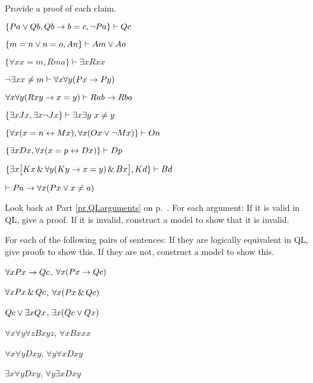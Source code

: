 \problempart
\label{pr.identity}
Provide a proof of each claim.
\begin{earg}
\item $\{Pa \vee Qb, Qb \rightarrow b=c, \neg Pa\}\vdash Qc$
\item $\{m=n \vee n=o, An\}\vdash Am \vee Ao$
\item $\{\forall x x=m, Rma\}\vdash \exists x Rxx$
\item $\neg \exists x x \neq m \vdash \forall x\forall y (Px \rightarrow Py)$
\item $\forall x\forall y(Rxy \rightarrow x=y)\vdash Rab \rightarrow Rba$
\item $\{\exists x Jx, \exists x \neg Jx\}\vdash \exists x \exists y\ x\neq y$
\item $\{\forall x(x=n \leftrightarrow Mx), \forall x(Ox \vee \neg Mx)\}\vdash On$
\item $\{\exists x Dx, \forall x(x=p \leftrightarrow Dx)\}\vdash Dp$
\item $\{\exists x\bigl[Kx \,\&\, \forall y(Ky \rightarrow x=y) \,\&\, Bx\bigr], Kd\}\vdash Bd$
\item $\vdash Pa \rightarrow \forall x(Px \vee x \neq a)$
\end{earg}



\problempart
Look back at Part \ref{pr.QLarguments} on p.~\pageref{pr.QLarguments}. For each argument: If it is valid in QL, give a proof. If it is invalid, construct a model to show that it is invalid.

\solutions
\problempart
\label{pr.QLequivornot}
For each of the following pairs of sentences: If they are logically equivalent in QL, give proofs to show this. If they are not, construct a model to show this.
\begin{earg}
\item $\forall x Px \rightarrow Qc$, $\forall x (Px \rightarrow Qc)$
\item $\forall x Px \,\&\, Qc$, $\forall x (Px \,\&\, Qc)$
\item $Qc \vee \exists x Qx$, $\exists x (Qc \vee Qx)$
\item $\forall x\forall y \forall z Bxyz$, $\forall x Bxxx$
\item $\forall x\forall y Dxy$, $\forall y\forall x Dxy$
\item $\exists x\forall y Dxy$, $\forall y\exists x Dxy$
\end{earg}

